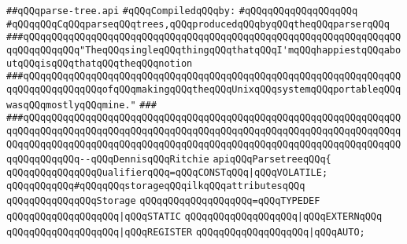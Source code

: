 \label{src/lib/c-kit/src/parser/parse-tree.api}
\verb|##qQQqparse-tree.api|\newline
\newline
\verb|#qQQqCompiledqQQqby:|\newline
\verb|#qQQqqQQqqQQqqQQqqQQq|\newline
\newline
\verb|#qQQqqQQqCqQQqparseqQQqtrees,qQQqproducedqQQqbyqQQqtheqQQqparserqQQq|\newline
\newline
\newline
\newline
\verb|###qQQqqQQqqQQqqQQqqQQqqQQqqQQqqQQqqQQqqQQqqQQqqQQqqQQqqQQqqQQqqQQqqQQqqQQqqQQqqQQq"TheqQQqsingleqQQqthingqQQqthatqQQqI'mqQQqhappiestqQQqaboutqQQqisqQQqthatqQQqtheqQQqnotion|\newline
\verb|###qQQqqQQqqQQqqQQqqQQqqQQqqQQqqQQqqQQqqQQqqQQqqQQqqQQqqQQqqQQqqQQqqQQqqQQqqQQqqQQqqQQqofqQQqmakingqQQqtheqQQqUnixqQQqsystemqQQqportableqQQqwasqQQqmostlyqQQqmine."|\newline
\verb|###|\newline
\verb|###qQQqqQQqqQQqqQQqqQQqqQQqqQQqqQQqqQQqqQQqqQQqqQQqqQQqqQQqqQQqqQQqqQQqqQQqqQQqqQQqqQQqqQQqqQQqqQQqqQQqqQQqqQQqqQQqqQQqqQQqqQQqqQQqqQQqqQQqqQQqqQQqqQQqqQQqqQQqqQQqqQQqqQQqqQQqqQQqqQQqqQQqqQQqqQQqqQQqqQQqqQQqqQQqqQQqqQQqqQQq--qQQqDennisqQQqRitchie|\newline
\newline
\newline
\newline
\verb|apiqQQqParsetreeqQQq{|\newline
\newline
\verb|qQQqqQQqqQQqqQQqQualifierqQQq=qQQqCONSTqQQq|\verb#|qQQqVOLATILE;#\newline
\newline
\verb|qQQqqQQqqQQq#qQQqqQQqstorageqQQqilkqQQqattributesqQQq|\newline
\verb|qQQqqQQqqQQqqQQqStorage|\newline
\verb|qQQqqQQqqQQqqQQqqQQq=qQQqTYPEDEF|\newline
\verb|qQQqqQQqqQQqqQQqqQQq|\verb#|qQQqSTATIC#\newline
\verb|qQQqqQQqqQQqqQQqqQQq|\verb#|qQQqEXTERNqQQq#\newline
\verb|qQQqqQQqqQQqqQQqqQQq|\verb#|qQQqREGISTER#\newline
\verb|qQQqqQQqqQQqqQQqqQQq|\verb#|qQQqAUTO;#\newline
